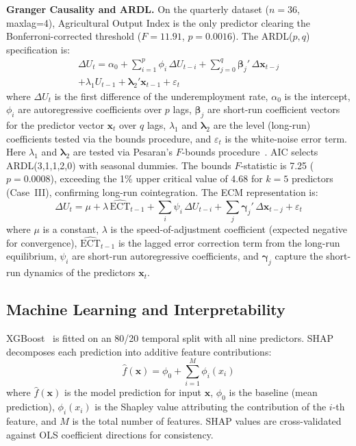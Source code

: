 \documentclass[conference]{IEEEtran}
\begin{document}
\textbf{Granger Causality and ARDL.} On the quarterly dataset ($n{=}36$,
maxlag=4), Agricultural Output Index is the only predictor clearing the
Bonferroni-corrected threshold ($F{=}11.91$, $p{=}0.0016$). The
ARDL($p,q$) specification is:
%
\begin{multline}
  \Delta U_t = \alpha_0
    + \sum_{i=1}^{p}\phi_i\,\Delta U_{t-i}
    + \sum_{j=0}^{q}\boldsymbol{\beta}_j'\,\Delta\mathbf{x}_{t-j} \\
    + \lambda_1 U_{t-1}
    + \boldsymbol{\lambda}_2'\mathbf{x}_{t-1}
    + \varepsilon_t
  \label{eq:ardl}
\end{multline}
%
\noindent where $\Delta U_t$ is the first difference of the
underemployment rate, $\alpha_0$ is the intercept, $\phi_i$ are
autoregressive coefficients over $p$ lags, $\boldsymbol{\beta}_j$ are
short-run coefficient vectors for the predictor vector
$\mathbf{x}_t$ over $q$ lags, $\lambda_1$ and
$\boldsymbol{\lambda}_2$ are the level (long-run) coefficients tested
via the bounds procedure, and $\varepsilon_t$ is the white-noise error
term. Here $\lambda_1$ and $\boldsymbol{\lambda}_2$ are tested via Pesaran's
$F$-bounds procedure~\cite{pesaran2001}. AIC selects ARDL(3,1,1,2,0)
with seasonal dummies. The bounds $F$-statistic is 7.25 ($p{=}0.0008$),
exceeding the 1\% upper critical value of 4.68 for $k{=}5$ predictors
(Case~III), confirming long-run cointegration. The ECM representation is:
%
\begin{equation}
  \Delta U_t = \mu + \lambda\,\widehat{\text{ECT}}_{t-1}
    + \sum_{i}\psi_i\,\Delta U_{t-i}
    + \sum_{j}\boldsymbol{\gamma}_j'\,\Delta\mathbf{x}_{t-j}
    + \varepsilon_t
  \label{eq:ecm}
\end{equation}
%
\noindent where $\mu$ is a constant, $\lambda$ is the speed-of-adjustment
coefficient (expected negative for convergence),
$\widehat{\text{ECT}}_{t-1}$ is the lagged error correction term from the
long-run equilibrium, $\psi_i$ are short-run autoregressive coefficients,
and $\boldsymbol{\gamma}_j$ capture the short-run dynamics of the
predictors $\mathbf{x}_t$.

\subsection{Machine Learning and Interpretability}

XGBoost~\cite{chen2016xgboost} is fitted on an 80/20 temporal split with
all nine predictors. SHAP~\cite{lundberg2017unified} decomposes each
prediction into additive feature contributions:
%
\begin{equation}
  \hat{f}(\mathbf{x}) = \phi_0 + \sum_{i=1}^{M} \phi_i(x_i)
  \label{eq:shap}
\end{equation}
%
\noindent where $\hat{f}(\mathbf{x})$ is the model prediction for input
$\mathbf{x}$, $\phi_0$ is the baseline (mean prediction), $\phi_i(x_i)$
is the Shapley value attributing the contribution of the $i$-th feature,
and $M$ is the total number of features. SHAP values are
cross-validated against OLS coefficient directions for consistency.
\end{document}
